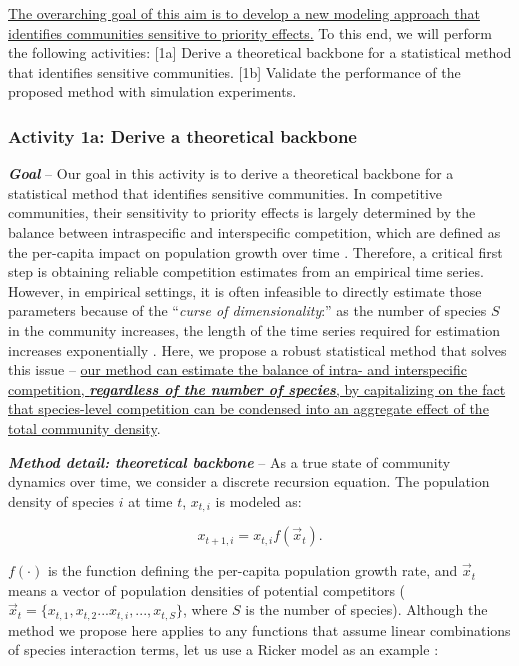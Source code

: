 \documentclass[12pt, class=article, crop=false]{standalone}
\begin{document}
\ul{The overarching goal of this aim is to develop a new modeling approach that identifies communities sensitive to priority effects.}
To this end, we will perform the following activities:
[1a] Derive a theoretical backbone for a statistical method that identifies sensitive communities.
[1b] Validate the performance of the proposed method with simulation experiments.

\subsubsection*{Activity 1a: Derive a theoretical backbone}

\textbf{\textit{Goal}} -- 
Our goal in this activity is to derive a theoretical backbone for a statistical method that identifies sensitive communities.
In competitive communities, their sensitivity to priority effects is largely determined by the balance between intraspecific and interspecific competition, which are defined as the per-capita impact on population growth over time \citep{chesson_mechanisms_2000, barabas_chessons_2018, ke_coexistence_2018, terui_intentional_2023}.
Therefore, a critical first step is obtaining reliable competition estimates from an empirical time series.
However, in empirical settings, it is often infeasible to directly estimate those parameters because of the ``\textit{curse of dimensionality}:'' as the number of species $S$ in the community increases, the length of the time series required for estimation increases exponentially \citep{ovaskainen_how_2017}.
Here, we propose a robust statistical method that solves this issue -- \ul{our method can estimate the balance of intra- and interspecific competition, \textbf{\textit{regardless of the number of species}}, by capitalizing on the fact that species-level competition can be condensed into an aggregate effect of the total community density}.

\textbf{\textit{Method detail: theoretical backbone}} -- 
As a true state of community dynamics over time, we consider a discrete recursion equation. The population density of species $i$ at time $t$, $x_{t,i}$ is modeled as:

\begin{equation}
\label{eq:m0}
x_{t + 1, i} = x_{t, i} f(\overset{\rightarrow}{x}_{t}).
\end{equation}

$f(\cdot)$ is the function defining the per-capita population growth rate, and $\overset{\rightarrow}{x}_{t}$ means a vector of population densities of potential competitors ($\overset{\rightarrow}{x}_{t} = \{x_{t,1}, x_{t,2}...x_{t,i},...,x_{t,S}\}$, where $S$ is the number of species).
Although the method we propose here applies to any functions that assume linear combinations of species interaction terms, let us use a Ricker model as an example \citep{ricker_stock_1954, fowler_species_2012, terui_intentional_2023}:
\end{document}
